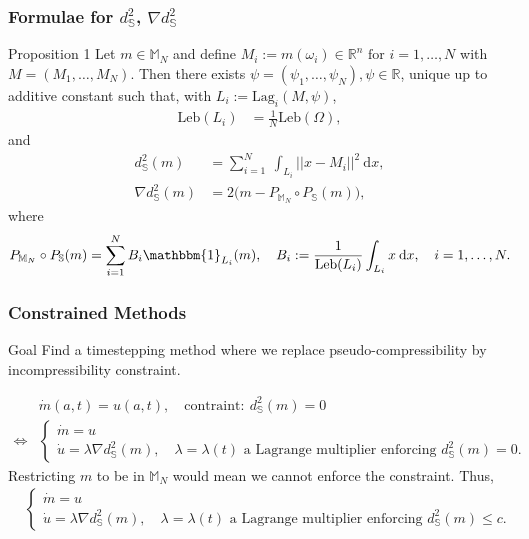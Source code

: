 \documentclass[10pt]{beamer}
\newcommand{\R}{\mathbb{R}}
\newcommand{\MN}{\mathbb{M}_N}
\newcommand{\dsmsq}{d^{2}_{\mathbb{S}}(m)}
\newcommand{\graddsmsq}{\nabla{d^{2}_{\mathbb{S}}(m)}}
\newcommand{\Sb}{\mathbb{S}}
\newcommand{\Leb}{\mathrm{Leb}}
\begin{document}
\frame
{
  \frametitle{Formulae for \(d^2_\Sb\), \(\nabla d^2_\Sb\)}

\begin{block}{Proposition 1}
Let \(m \in \MN\) and define \(M_i := m(\omega_i) \in \R^n \text{ for } i = 1,\dots,N\) with \(M = (M_1,\dots,M_N)\). Then there exists \(\psi = (\psi_1,\dots,\psi_N), \psi \in \R\), unique up to additive constant such that, with \(L_i := \mathrm{Lag}_i(M, \psi)\), 
\begin{align}
\Leb(L_i) &= \frac{1}{N}\Leb(\Omega),
\end{align}
and
\begin{align}
\dsmsq & = \sum_{i=1}^N \: \int_{L_i} || x - M_i ||^2 \: \mathrm{d}x, \\
\graddsmsq &= 2 \big( m - P_{\MN} \circ P_{\mathbb{S}}(m) \big),
\end{align}
where
\begin{align*}
P_{\MN} \circ P_{\mathbb{S}}(m) = \sum^N_{i=1} B_i \mathbbm{1}_{L_i}(m), \quad B_i := \frac{1}{\Leb(L_i)} \int_{L_i} x \: \mathrm{d}x, \quad i = 1,\dots,N. 
\end{align*}
\end{block}
}

\frame
{
  \frametitle{Constrained Methods}

\begin{block}{Goal}
Find a timestepping method where we replace pseudo-compressibility by incompressibility constraint.
\end{block}
\begin{align*}
& \dot{m}(a, t) = u(a,t), \quad \text{contraint}: \: \dsmsq = 0 \\
\iff
 &\begin{cases}
  \dot{m} = u \\
  \dot{u} = \lambda \graddsmsq, \quad \lambda = \lambda(t) \text{ a Lagrange multiplier enforcing } \dsmsq = 0.
 \end{cases} 
\end{align*}
Restricting \(m\) to be in \(\MN\) would mean we cannot enforce the constraint. Thus, 
\begin{align}
 &\begin{cases}
  \dot{m} = u \\
  \dot{u} = \lambda \graddsmsq, \quad \lambda = \lambda(t) \text{ a Lagrange multiplier enforcing } \dsmsq \le c.
 \end{cases} 
\end{align}
}
\end{document}
